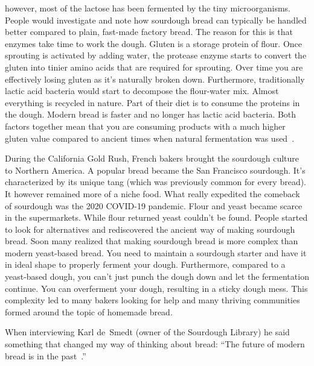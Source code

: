 however, most of the lactose has been fermented by
the tiny microorganisms. People would investigate and
note how sourdough bread can typically be handled better
compared to plain, fast-made factory bread. The
reason for this is that enzymes take time to work the dough.
Gluten is a storage protein of flour. Once
sprouting is activated by adding water, the protease
enzyme starts to convert the gluten into tinier amino acids
that are required for sprouting. Over time you are effectively
losing gluten as it's naturally broken down. Furthermore,
traditionally lactic acid bacteria would start to decompose
the flour-water mix. Almost everything is recycled in nature.
Part of their diet is to consume the proteins in the dough.
Modern bread is faster and no longer has lactic acid bacteria.
Both factors together mean that you are consuming products
with a much higher gluten value compared to ancient times
when natural fermentation was used~\cite{raffaella+di+cagno}.

During the California Gold Rush, French bakers brought the sourdough
culture to Northern America. A popular bread became the
San Francisco sourdough. It's characterized by its unique
tang (which was previously common for every bread). It
however remained more of a niche food. What really expedited
the comeback of sourdough was the 2020 COVID-19 pandemic.
Flour and yeast became scarce in the supermarkets. While
flour returned yeast couldn't be found. People started
to look for alternatives and rediscovered the ancient
way of making sourdough bread. Soon many realized
that making sourdough bread is more complex than modern
yeast-based bread. You need to maintain a sourdough starter
and have it in ideal shape to properly ferment your dough.
Furthermore, compared to a yeast-based dough, you can't just
punch the dough down and let the fermentation continue.
You can overferment your dough, resulting in a sticky
dough mess. This complexity led to many bakers looking
for help and many thriving communities formed around
the topic of homemade bread.

When interviewing Karl de~Smedt (owner of the Sourdough
Library) he said something that changed my way of thinking
about bread: ``The future of
modern bread is in the past~\cite{interview+karl+de+smedt}.''
